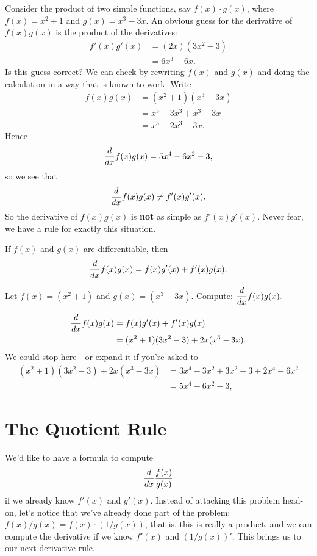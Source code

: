 Consider the product of two simple functions, say
$f(x)\cdot g(x)$, where $f(x)=x^2+1$ and $g(x)=x^3-3x$. An obvious guess for the derivative of $f(x)g(x)$ is the product of the derivatives:
\begin{align*}
f'(x)g'(x) &= (2x)(3x^2-3)\\
&= 6x^3-6x.
\end{align*}
Is this guess correct? We can check by rewriting $f(x)$
and $g(x)$ and doing the calculation in a way that is known to
work. Write 
\begin{align*}
f(x)g(x) &= (x^2+1)(x^3-3x)\\
&=x^5-3x^3+x^3-3x\\
&=x^5-2x^3-3x.
\end{align*} 
Hence
\[
\displaystyle\frac{d}{dx} f(x) g(x) = 5x^4-6x^2-3, 
\]
so we see that 
\[
\displaystyle\frac{d}{dx} f(x) g(x) \ne  f'(x)g'(x).
\]
So the derivative of $f(x)g(x)$ is \textbf{not} as simple as
$f'(x)g'(x)$. Never fear, we have a rule for exactly this
situation. \cite{mooc}
\begin{theorem}\label{theorem:product-rule}
If $f(x)$ and $g(x)$ are differentiable, then
$$\displaystyle\frac{d}{dx} f(x)g(x) = f(x)g'(x)+f'(x)g(x).$$
\end{theorem}
\clearpage
\begin{example} 
    Let $f(x)=(x^2+1)$ and $g(x)=(x^3-3x)$. Compute:
    $\displaystyle\frac{d}{dx} f(x)g(x).$ \cite{mooc}
    \begin{solution}
    \begin{align*}
    \displaystyle\frac{d}{dx} f(x)g(x) &= f(x)g'(x) + f'(x)g(x)\\
    &=(x^2+1)(3x^2-3) + 2x(x^3-3x).
    \end{align*}
    We could stop here---or expand it if you're asked to
    \begin{align*}
    (x^2+1)(3x^2-3) + 2x(x^3-3x) &= 3x^4-3x^2 +3x^2 -3 + 2x^4-6x^2\\
    &=5x^4-6x^2-3,
    \end{align*}
    \end{solution}
\end{example}

\section{The Quotient Rule}

We'd like to have a formula to compute
$$
\displaystyle\frac{d}{dx} \frac{f(x)}{g(x)}
$$
if we already know $f'(x)$ and $g'(x)$. Instead of attacking this
problem head-on, let's notice that we've already done part of the
problem: $f(x)/g(x)= f(x)\cdot(1/g(x))$, that is, this is really a
product, and we can compute the derivative if we know $f'(x)$ and
$(1/g(x))'$. This brings us to our next derivative rule. \cite{mooc}

